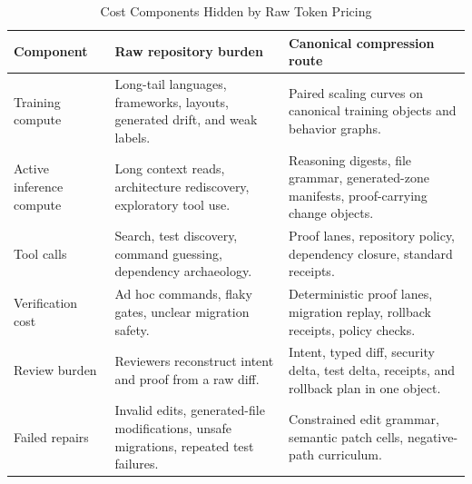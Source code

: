 \begin{table}[t]
\caption{Cost Components Hidden by Raw Token Pricing}
\label{tab:costcomponents}
\centering
\footnotesize
\begin{tabularx}{\textwidth}{p{}X X}
\toprule
Component & Raw repository burden & Canonical compression route \\
\midrule
Training compute & Long-tail languages, frameworks, layouts, generated drift, and weak labels. & Paired scaling curves on canonical training objects and behavior graphs. \\
Active inference compute & Long context reads, architecture rediscovery, exploratory tool use. & Reasoning digests, file grammar, generated-zone manifests, proof-carrying change objects. \\
Tool calls & Search, test discovery, command guessing, dependency archaeology. & Proof lanes, repository policy, dependency closure, standard receipts. \\
Verification cost & Ad hoc commands, flaky gates, unclear migration safety. & Deterministic proof lanes, migration replay, rollback receipts, policy checks. \\
Review burden & Reviewers reconstruct intent and proof from a raw diff. & Intent, typed diff, security delta, test delta, receipts, and rollback plan in one object. \\
Failed repairs & Invalid edits, generated-file modifications, unsafe migrations, repeated test failures. & Constrained edit grammar, semantic patch cells, negative-path curriculum. \\
\bottomrule
\end{tabularx}
\end{table}

